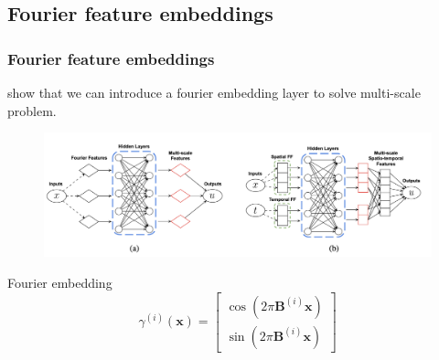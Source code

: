 \documentclass[8pt,aspectratio=15,mathserif]{beamer}
\begin{document}
\subsection{Fourier feature embeddings}
\begin{frame}
\frametitle{Fourier feature embeddings}
\cite{FT_embedding} show that we can introduce a fourier embedding layer to solve multi-scale problem.
\begin{figure}
\centering
\includegraphics[width=0.8\linewidth]{img/Fourier_embedding.png}
\end{figure}
\begin{block}{Fourier embedding}
$$
\gamma^{(i)}(\boldsymbol{x})=\left[\begin{array}{l}
\cos \left(2 \pi \boldsymbol{B}^{(i)} \boldsymbol{x}\right) \\
\sin \left(2 \pi \boldsymbol{B}^{(i)} \boldsymbol{x}\right)
\end{array}\right]
$$
\end{block}
\end{frame}
\newpage
{}
\end{document}
